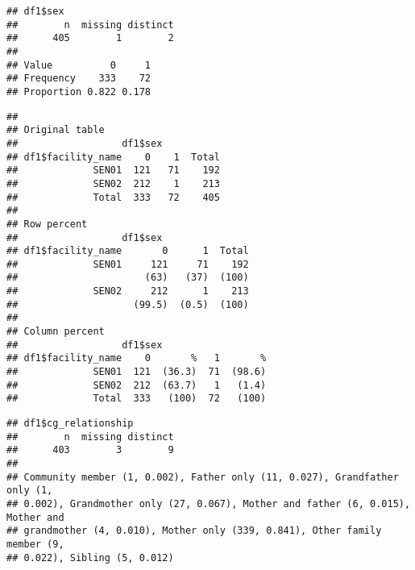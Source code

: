 \documentclass[
]{article}
\begin{document}
\begin{verbatim}
## df1$sex 
##        n  missing distinct 
##      405        1        2 
##                       
## Value          0     1
## Frequency    333    72
## Proportion 0.822 0.178
\end{verbatim}

\begin{verbatim}
## 
## Original table 
##                  df1$sex
## df1$facility_name    0    1  Total
##             SEN01  121   71    192
##             SEN02  212    1    213
##             Total  333   72    405
## 
## Row percent 
##                  df1$sex
## df1$facility_name       0      1  Total
##             SEN01     121     71    192
##                      (63)   (37)  (100)
##             SEN02     212      1    213
##                    (99.5)  (0.5)  (100)
## 
## Column percent 
##                  df1$sex
## df1$facility_name    0       %   1       %
##             SEN01  121  (36.3)  71  (98.6)
##             SEN02  212  (63.7)   1   (1.4)
##             Total  333   (100)  72   (100)
\end{verbatim}

\begin{verbatim}
## df1$cg_relationship 
##        n  missing distinct 
##      403        3        9 
## 
## Community member (1, 0.002), Father only (11, 0.027), Grandfather only (1,
## 0.002), Grandmother only (27, 0.067), Mother and father (6, 0.015), Mother and
## grandmother (4, 0.010), Mother only (339, 0.841), Other family member (9,
## 0.022), Sibling (5, 0.012)
\end{verbatim}
\end{document}
